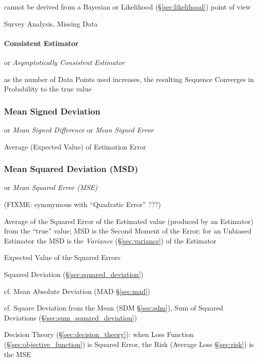 cannot be derived from a Bayesian or Likelihood (\S\ref{sec:likelihood}) point
of view

Survey Analysis, Missing Data



\paragraph{Consistent Estimator}\label{sec:consistent_estimator}\hfill

or \emph{Asymptotically Consistent Estimator}

as the number of Data Points used increases, the resulting Sequence Converges in
Probability to the true value



\subsubsection{Mean Signed Deviation}\label{sec:mean_signed_deviation}

or \emph{Mean Signed Difference} or \emph{Mean Signed Error}

Average (Expected Value) of Estimation Error



\subsubsection{Mean Squared Deviation (MSD)}\label{sec:msd}

or \emph{Mean Squared Error (MSE)}

(FIXME: synonymous with ``Quadratic Error'' ???)

Average of the Squared Error of the Estimated value (produced by an Estimator)
from the ``true'' value; MSD is the Second Moment of the Error; for an Unbiased
Estimator the MSD is the \emph{Variance} (\S\ref{sec:variance}) of the Estimator

Expected Value of the Squared Errors

Squared Deviation (\S\ref{sec:squared_deviation})

cf. Mean Absolute Deviation (MAD \S\ref{sec:mad})

cf. Square Deviation from the Mean (SDM \S\ref{sec:sdm}), Sum of Squared
Deviations (\S\ref{sec:sum_squared_deviation})

\fist Decision Theory (\S\ref{sec:decision_theory}): when Loss Function
(\S\ref{sec:objective_function}) is Squared Error, the Risk (Average Loss
\S\ref{sec:risk}) is the MSE

